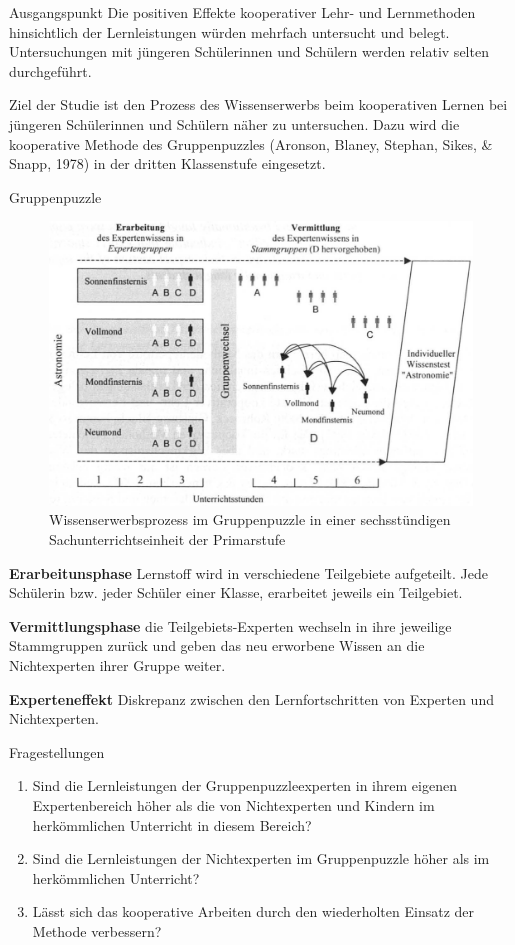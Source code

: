 \begin{block}{Ausgangspunkt}
Die positiven Effekte kooperativer Lehr- und Lernmethoden hinsichtlich der Lernleistungen würden mehrfach untersucht und belegt. Untersuchungen mit jüngeren Schülerinnen und Schülern werden relativ selten durchgeführt.

Ziel der Studie ist den Prozess des Wissenserwerbs beim kooperativen Lernen bei jüngeren Schülerinnen und Schülern näher zu untersuchen. Dazu wird die kooperative Methode des Gruppenpuzzles (Aronson, Blaney, Stephan, Sikes, \& Snapp, 1978) in der dritten Klassenstufe eingesetzt.
\end{block}

\begin{block}{Gruppenpuzzle} 
\begin{figure}
\includegraphics[width=0.67\linewidth]{experteneffekt.jpg}
\caption{Wissenserwerbsprozess im Gruppenpuzzle in einer sechsstündigen Sachunterrichtseinheit der Primarstufe}
\end{figure}

\textbf{Erarbeitunsphase} Lernstoff wird in verschiedene Teilgebiete aufgeteilt. Jede Schülerin bzw. jeder Schüler einer Klasse, erarbeitet jeweils ein Teilgebiet.

\textbf{Vermittlungsphase} die Teilgebiets-Experten wechseln in ihre jeweilige Stammgruppen zurück und geben das neu erworbene Wissen an die Nichtexperten ihrer Gruppe weiter. 

\textbf{Experteneffekt} Diskrepanz zwischen den Lernfortschritten von Experten und Nichtexperten.  
\end{block}

\begin{alertblock}{Fragestellungen}
\begin{enumerate}
\item Sind die Lernleistungen der Gruppenpuzzleexperten in ihrem eigenen Expertenbereich höher als die von Nichtexperten und Kindern im herkömmlichen Unterricht in diesem Bereich?
\item Sind die Lernleistungen der Nichtexperten im Gruppenpuzzle höher als im herkömmlichen Unterricht?
\item Lässt sich das kooperative Arbeiten durch den wiederholten Einsatz der Methode verbessern?
\end{enumerate}
\end{alertblock}

